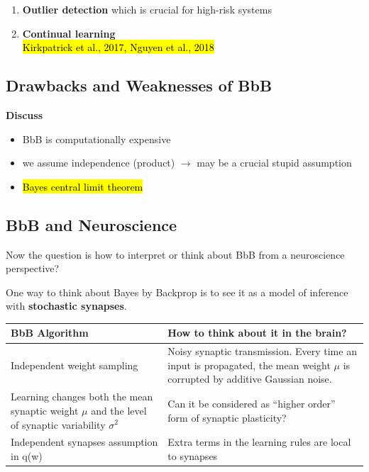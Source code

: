\documentclass[main]{subfiles}
\begin{document}
\begin{enumerate}
    \item \textbf{Outlier detection} which is crucial for high-risk systems
    \item \textbf{Continual learning}\\
        \hl{Kirkpatrick et al., 2017, Nguyen et al., 2018}
\end{enumerate}

\subsection{Drawbacks and Weaknesses of BbB}
\textbf{Discuss}
\begin{itemize}
    \item BbB is computationally expensive
    \item we assume independence (product) $\to$ may be a crucial stupid assumption
    \item \hl{Bayes central limit theorem}
\end{itemize}

\subsection{BbB and Neuroscience}
Now the question is how to interpret or think about BbB from a neuroscience perspective?

\noindent One way to think about Bayes by Backprop is to see it as a model of inference with \textbf{stochastic synapses}.

\begin{center}
    \begin{tabular}{p{5cm}p{7cm}}
    \toprule
    \textbf{BbB Algorithm} & \textbf{How to think about it in the brain?}
    \\\toprule
    Independent weight sampling &  Noisy synaptic transmission. Every time an input is propagated, the mean weight $\mu$ is corrupted by additive Gaussian noise.
    \\\midrule
    Learning changes both the mean synaptic weight $\mu$ and the level of synaptic variability $\sigma^2$ & Can it be considered as “higher order” form of synaptic plasticity?
    \\\midrule
    Independent synapses assumption in q(w) &  Extra terms in the learning rules are local to synapses
    \\\bottomrule
    \end{tabular}
\end{center}
\end{document}
